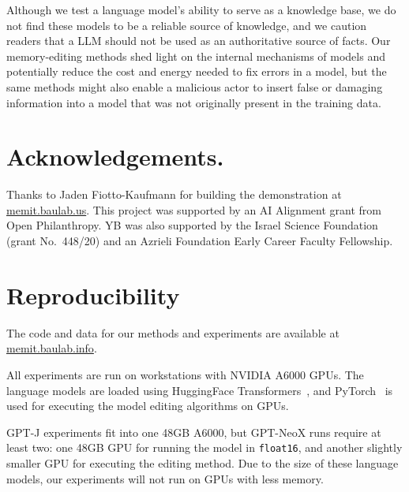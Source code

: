 \documentclass{article} %
\begin{document}
Although we test a language model's ability to serve as a knowledge base, we do not find these models to be a reliable source of knowledge, and we caution readers that a LLM should not be used as an authoritative source of facts. Our memory-editing methods shed light on the internal mechanisms of models and potentially reduce the cost and energy needed to fix errors in a model, but the same methods might also enable a malicious actor to insert false or damaging information into a model that was not originally present in the training data.


\section{Acknowledgements.}

Thanks to Jaden Fiotto-Kaufmann for building the demonstration at \hyperlink{https://memit.baulab.us/}{memit.baulab.us}.  This project was supported by an AI Alignment grant from Open Philanthropy.  YB was also supported by the Israel Science Foundation (grant No.\ 448/20) and an Azrieli Foundation Early Career Faculty Fellowship.



\section{Reproducibility}

The code and data for our methods and experiments are available
at \href{https://memit.baulab.info}{memit.baulab.info}.

All experiments are run on workstations with NVIDIA A6000 GPUs. The language models are loaded using HuggingFace Transformers~\citep{wolf2019huggingface}, and PyTorch~\citep{paszke2019pytorch} is used for executing the model editing algorithms on GPUs.

GPT-J experiments fit into one 48GB A6000, but GPT-NeoX runs require at least two: one 48GB GPU for running the model in \texttt{float16}, and another slightly smaller GPU for executing the editing method. Due to the size of these language models, our experiments will not run on GPUs with less memory.





\end{document}
